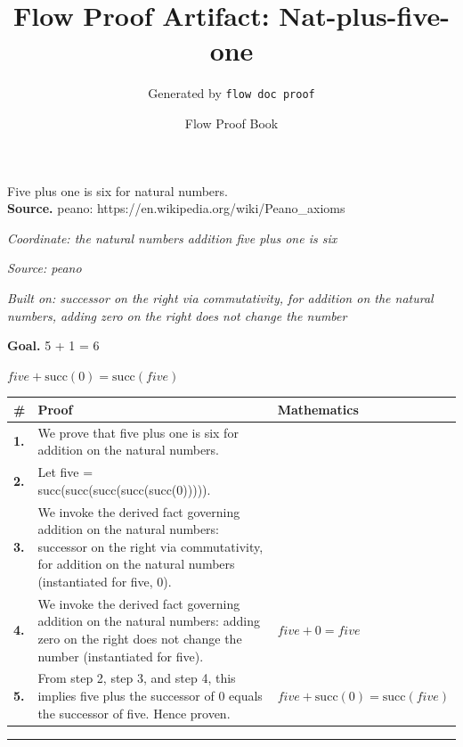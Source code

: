\documentclass[11pt]{article}
\title{Flow Proof Artifact: Nat-plus-five-one}
\author{Generated by \texttt{flow doc proof}}
\date{Flow Proof Book}
\theoremstyle{definition}
\begin{document}
\maketitle
Five plus one is six for natural numbers.\\[0.5em]
\textbf{Source.} peano: https://en.wikipedia.org/wiki/Peano\_axioms\\[0.5em]
\bigskip
{}\par
\smallskip\noindent\textit{Coordinate: the natural numbers \cdot addition \cdot five plus one is six}\par
\smallskip\noindent\textit{Source: peano}\par
\smallskip\noindent\textit{Built on: successor on the right via commutativity, for addition on the natural numbers, adding zero on the right does not change the number}\par
\medskip
\noindent\textbf{Goal.} 5 + 1 = 6\par
\noindent$\displaystyle five + \mathrm{succ}(0) = \mathrm{succ}(five)$\par
\medskip
\noindent
\begin{tabular}{@{} >{\raggedright\arraybackslash}p{} >{\raggedright\arraybackslash}p{} >{\raggedleft\arraybackslash}p{} @{}}
\textbf{\#} & \textbf{Proof} & \textbf{Mathematics} \\
\midrule
\textbf{1.} & We prove that five plus one is six for addition on the natural numbers. & \\[0.45em]
\textbf{2.} & Let five = succ(succ(succ(succ(succ(0))))). & \\[0.45em]
\textbf{3.} & We invoke the derived fact governing addition on the natural numbers: successor on the right via commutativity, for addition on the natural numbers (instantiated for five, 0). & \\[0.45em]
\textbf{4.} & We invoke the derived fact governing addition on the natural numbers: adding zero on the right does not change the number (instantiated for five). & $\displaystyle five + 0 = five$ \\[0.45em]
\textbf{5.} & From step 2, step 3, and step 4, this implies five plus the successor of 0 equals the successor of five. Hence proven. & $\displaystyle five + \mathrm{succ}(0) = \mathrm{succ}(five)$ \\[0.45em]
\bottomrule
\end{tabular}
\label{thm:Nat-addition-five_plus_one_is_six}
\par\medskip\hrule
\end{document}

